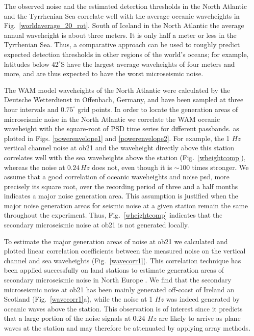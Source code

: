 \documentclass{article}
\begin{document}
{The observed noise and the estimated 
detection
thresholds 
in the North Atlantic and the Tyrrhenian Sea
correlate well with the average oceanic waveheights
in Fig.~\ref{worldaverage_20_rot}. 
South of Iceland in the North Atlantic the average annual waveheight 
is about three meters. It is only half a meter or less in the 
Tyrrhenian Sea.
Thus, a comparative approach can be used to 
roughly predict 
expected detection thresholds in other regions 
of the world's oceans;
for example, latitudes below $42^{\circ}$S have the largest
average waveheights of four  meters and more, and are thus expected
to have the worst microseismic noise.

The WAM model waveheights  of the North Atlantic were calculated by
the Deutsche Wetterdienst in Offenbach, Germany, and have been 
sampled at three hour intervals and 
$0.75^{\circ}$ grid points. 
In order to locate the generation areas of microseismic noise in the 
North Atlantic we correlate the WAM oceanic waveheight 
with the square-root of
PSD time series for different passbands. 
as plotted in 
Figs.  \ref{powerenvelope1} and \ref{powerenvelope2}.
For example, the 1 $Hz$ vertical channel 
noise at ob21 and the waveheight directly above this station 
correlates well with the sea waveheights above the station
(Fig.~\ref{wheightcomp}), 
whereas the noise at $0.24\, Hz$ does not, even though it is $\sim$100 times stronger.
We assume that a good correlation of oceanic waveheights and noise 
psd, more precisely its square root, 
over the recording period of three and a half months
indicates a major noise generation area.
This assumption is justified when the major noise generation areas for seismic noise at a given station remain the same throughout
the experiment.
Thus, 
Fig.~\ref{wheightcomp} indicates 
that the secondary microseismic noise at ob21 
is not generated locally.

To estimate the major generation areas of noise at ob21 we
calculated and plotted linear correlation coefficients between the 
measured noise on the vertical channel and 
sea waveheights (Fig.~\ref{wavecorr1}).
This correlation technique has been applied successfully 
on land stations 
to estimate generation areas of secondary microseismic noise
in North Europe
\cite[][]{essen:03}.
We find that the secondary microseismic noise at ob21 
has been mainly generated off-coast of Ireland an Scotland
(Fig.~\ref{wavecorr1}a), while the 
noise at 1 $Hz$ was indeed generated by oceanic waves above the station.
This observation is of interest since  it predicts that a large portion
of the noise signals at 0.24 $Hz$ are likely to 
arrive as plane waves at the station 
and may therefore be attenuated by applying array methods.

}
\end{document}
